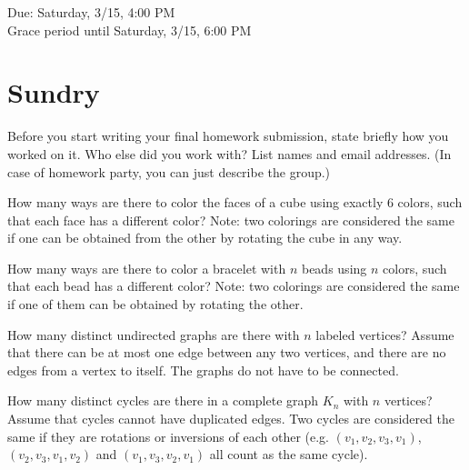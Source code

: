 \documentclass[11pt]{article}
\begin{document}
\maketitle
\fontsize{12}{15}\selectfont

\begin{center}
    Due: Saturday, 3/15, 4:00 PM \\
    Grace period until Saturday, 3/15, 6:00 PM \\
\end{center}

\section*{Sundry}
Before you start writing your final homework submission, state briefly how you worked on it.  Who else did you work with?  List names and email addresses.  (In case of homework party, you can just describe the group.)

\vspace{15pt}

\begin{Parts}

    \Part How many ways are there to color the faces of a cube using exactly $6$ colors, such that each face has a different color? Note: two colorings are considered the same if one can be obtained from the other by rotating the cube in any way.
    

    \Part How many ways are there to color a bracelet with $n$ beads using $n$ colors, such that each bead has a different color? Note: two colorings are considered the same if one of them can be obtained by rotating the other.
    

    \Part How many distinct undirected graphs are there with $n$ labeled vertices? Assume that there can be at most one edge between any two vertices, and there are no edges from a vertex to itself. The graphs do not have to be connected.
    

    \Part How many distinct cycles are there in a complete graph $K_n$ with $n$
     vertices? Assume that cycles cannot have duplicated edges. Two cycles are
     considered the same if they are rotations or inversions of each other (e.g.
     $(v_1,v_2,v_3,v_1)$, $(v_2,v_3,v_1,v_2)$ and $(v_1,v_3,v_2,v_1)$ all count as
     the same cycle).
     


\end{Parts}
\end{document}
